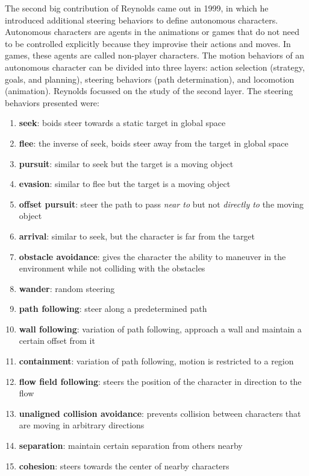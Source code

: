 The second big contribution of Reynolds came out in 1999\cite{craigSteeringBehaviors}, in which he introduced additional steering behaviors to define autonomous characters. Autonomous characters are agents in the animations or games that do not need to be controlled explicitly because they improvise their actions and moves. In games, these agents are called non-player characters. The motion behaviors of an autonomous character can be divided into three layers: action selection (strategy, goals, and planning), steering behaviors (path determination), and locomotion (animation). Reynolds focussed on the study of the second layer. The steering behaviors presented were:
\begin{enumerate}
\item \textbf{seek}: boids steer towards a static target in global space
\item \textbf{flee}: the inverse of seek, boids steer away from the target in global space
\item \textbf{pursuit}: similar to seek but the target is a moving object
\item \textbf{evasion}: similar to flee but the target is a moving object
\item \textbf{offset pursuit}: steer the path to pass \textit{near to} but not \textit{directly to} the moving object
\item \textbf{arrival}: similar to seek, but the character is far from the target
\item \textbf{obstacle avoidance}: gives the character the ability to maneuver in the environment while not colliding with the obstacles 
\item \textbf{wander}: random steering
\item \textbf{path following}: steer along a predetermined path
\item \textbf{wall following}: variation of path following, approach a wall and maintain a certain offset from it
\item \textbf{containment}: variation of path following, motion is restricted to a region
\item \textbf{flow field following}: steers the position of the character in direction to the flow
\item \textbf{unaligned collision avoidance}: prevents collision between characters that are moving in arbitrary directions
\item \textbf{separation}: maintain certain separation from others nearby
\item \textbf{cohesion}: steers towards the center of nearby characters

\end{enumerate}
